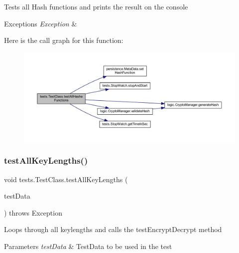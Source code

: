 Tests all Hash functions and prints the result on the console 
\begin{DoxyExceptions}{Exceptions}
{\em Exception} & \\
\hline
\end{DoxyExceptions}
Here is the call graph for this function\+:
\nopagebreak
\begin{figure}[H]
\begin{center}
\leavevmode
\includegraphics[width=350pt]{classtests_1_1_test_class_a4f4c0d8502a8a3b322a44e20a5f9cdce_cgraph}
\end{center}
\end{figure}
\mbox{\label{classtests_1_1_test_class_a8bf4e8d943fa1d61fbaa615dcefeca69}} 
\subsubsection{\texorpdfstring{test\+All\+Key\+Lengths()}{testAllKeyLengths()}}
{\footnotesize\ttfamily void tests.\+Test\+Class.\+test\+All\+Key\+Lengths (\begin{DoxyParamCaption}\item[{\mbox{\hyperlink{classpersistence_1_1_meta_data}{Meta\+Data}}}]{test\+Data }\end{DoxyParamCaption}) throws Exception\hspace{0.3cm}{\ttfamily [private]}}

Loops through all keylengths and calls the test\+Encrypt\+Decrypt method 
\begin{DoxyParams}{Parameters}
{\em test\+Data} & Test\+Data to be used in the test \\
\hline
\end{DoxyParams}

